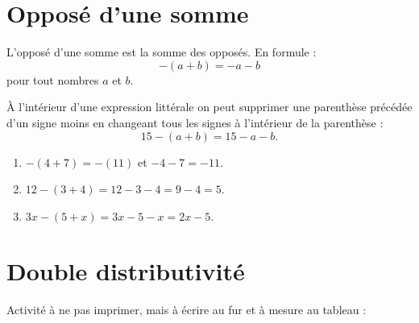 
\section{Opposé d'une somme}



\begin{Aretenir}
    L'opposé d'une somme est la somme des opposés. En formule :
    \begin{equation}
        -(a+b)=-a-b
    \end{equation}
    pour tout nombres \( a\) et \( b\).

    À l'intérieur d'une expression littérale on peut supprimer une parenthèse précédée d'un signe moins en changeant tous les signes à l'intérieur de la parenthèse :
    \begin{equation}
        15-(a+b)=15-a-b.
    \end{equation}
\end{Aretenir}

\begin{example}
    \begin{enumerate}
        \item
            \( -(4+7)=-(11)\) et \( -4-7=-11\).
        \item
            \( 12-(3+4)=12-3-4=9-4=5\).
        \item
            \( 3x-(5+x)=3x-5-x=2x-5\).
    \end{enumerate}
\end{example}

\section{Double distributivité}

Activité à ne pas imprimer, mais à écrire au fur et à mesure au tableau :





